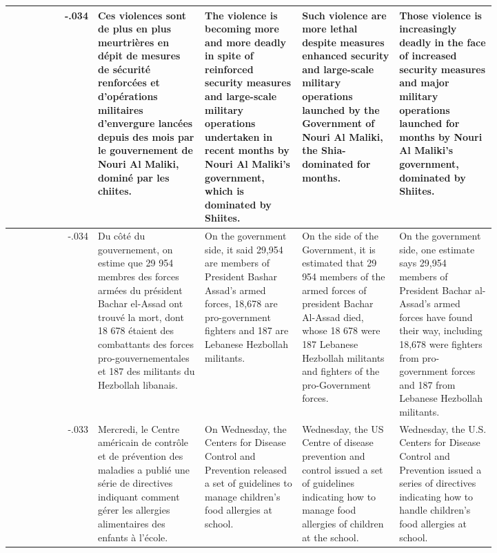 \begin{table}[ht]
\begin{tabular}{r @{\hspace{2mm}} p{0.22\linewidth}p{0.20\linewidth}p{0.20\linewidth}p{0.20\linewidth}}
-.034 & Ces violences sont de plus en plus meurtrières en dépit de mesures de sécurité renforcées et d'opérations militaires d'envergure lancées depuis des mois par le gouvernement de Nouri Al Maliki, dominé par les chiites. & The violence is becoming more and more deadly in spite of reinforced security measures and large-scale military operations undertaken in recent months by Nouri Al Maliki's government, which is dominated by Shiites. & Such violence are more lethal despite measures enhanced security and large-scale military operations launched by the Government of Nouri Al Maliki, the Shia-dominated for months. & Those violence is increasingly deadly in the face of increased security measures and major military operations launched for months by Nouri Al Maliki's government, dominated by Shiites. \\\hline
-.034 & Du côté du gouvernement, on estime que 29 954 membres des forces armées du président Bachar el-Assad ont trouvé la mort, dont 18 678 étaient des combattants des forces pro-gouvernementales et 187 des militants du Hezbollah libanais. & On the government side, it said 29,954 are members of President Bashar Assad's armed forces, 18,678 are pro-government fighters and 187 are Lebanese Hezbollah militants. & On the side of the Government, it is estimated that 29 954 members of the armed forces of president Bachar Al-Assad died, whose 18 678 were 187 Lebanese Hezbollah militants and fighters of the pro-Government forces. & On the government side, one estimate says 29,954 members of President Bachar al-Assad's armed forces have found their way, including 18,678 were fighters from pro-government forces and 187 from Lebanese Hezbollah militants. \\\hline
-.033 & Mercredi, le Centre américain de contrôle et de prévention des maladies a publié une série de directives indiquant comment gérer les allergies alimentaires des enfants à l'école. & On Wednesday, the Centers for Disease Control and Prevention released a set of guidelines to manage children's food allergies at school. & Wednesday, the US Centre of disease prevention and control issued a set of guidelines indicating how to manage food allergies of children at the school. & Wednesday, the U.S. Centers for Disease Control and Prevention issued a series of directives indicating how to handle children's food allergies at school. \\\hline

\end{tabular}
\end{table}
